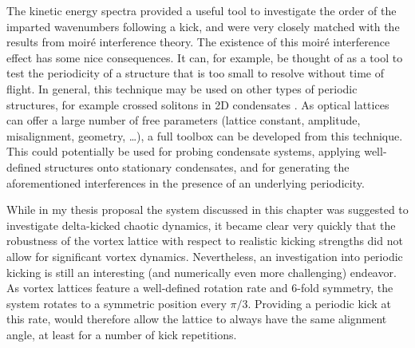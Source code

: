 The kinetic energy spectra provided a useful tool to investigate the order of the imparted wavenumbers following a kick, and were very closely matched with the results from moir\'e interference theory. The existence of this moir\'e interference effect has some nice consequences. It can, for example, be thought of as a tool to test the periodicity of a structure that is too small to resolve without time of flight. In general, this technique may be used on other types of periodic structures, for example crossed solitons in 2D condensates \cite{BEC:Morgan_soliton_2013}. As optical lattices can offer a large number of free parameters (lattice constant, amplitude, misalignment, geometry, \ldots), a full toolbox can be developed from this technique. This could potentially be used for probing condensate systems, applying well-defined structures onto stationary condensates, and for generating the aforementioned interferences in the presence of an underlying periodicity.


While in my thesis proposal the system discussed in this chapter was suggested to investigate delta-kicked chaotic dynamics, it became clear very quickly that the robustness of the vortex lattice with respect to realistic kicking strengths did not allow for significant vortex dynamics. Nevertheless, an investigation into periodic kicking is still an interesting (and numerically even more challenging) endeavor. As vortex lattices feature a well-defined rotation rate and 6-fold symmetry, the system rotates to a symmetric position every $\pi/3$. Providing a periodic kick at this rate, would therefore allow the lattice to always have the same alignment angle, at least for a number of kick repetitions.
